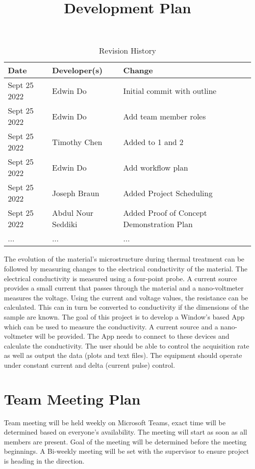 \documentclass{article}
\title{Development Plan\\\progname}
\author{\authname}
\date{}
\begin{document}
\begin{table}[hp]
\caption{Revision History} \label{TblRevisionHistory}
\begin{tabularx}{\textwidth}{llX}
\toprule
\textbf{Date} & \textbf{Developer(s)} & \textbf{Change}\\
\midrule
Sept 25 2022 & Edwin Do & Initial commit with outline\\
Sept 25 2022 & Edwin Do & Add team member roles\\
Sept 25 2022 & Timothy Chen & Added to 1 and 2\\
Sept 25 2022 & Edwin Do & Add workflow plan \\
Sept 25 2022 & Joseph Braun & Added Project Scheduling \\
Sept 25 2022 & Abdul Nour Seddiki & Added Proof of Concept Demonstration Plan \\
... & ... & ...\\
\bottomrule
\end{tabularx}
\end{table}

\newpage

\maketitle

\noindent The evolution of the material’s microstructure during thermal treatment can be followed by measuring changes to the electrical conductivity of the material. The electrical conductivity is measured using a four-point probe. A current source provides a small current that passes through the material and a nano-voltmeter measures the voltage. Using the current and voltage values, the resistance can be calculated. This can in turn be converted to conductivity if the dimensions of the sample are known. The goal of this project is to develop a Window’s based App which can be used to measure the conductivity. A current source and a nano- voltmeter will be provided. The App needs to connect to these devices and calculate the conductivity. The user should be able to control the acquisition rate as well as output the data (plots and text files). The equipment should operate under constant current and delta (current pulse) control.

\section{Team Meeting Plan}
Team meeting will be held weekly on Microsoft Teams, exact time will be determined based on everyone's availability.
The meeting will start as soon as all members are present. 
Goal of the meeting will be determined before the meeting beginnings. 
A Bi-weekly meeting will be set with the supervisor to ensure project is heading in the direction. 
\end{document}
